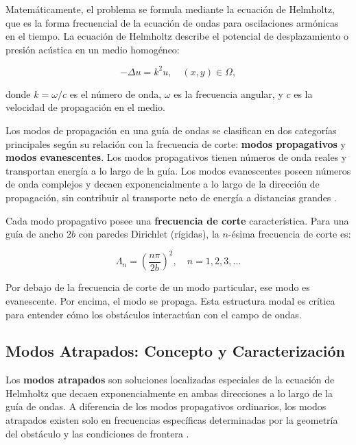 \documentclass[11pt]{article}
\begin{document}
Matemáticamente, el problema se formula mediante la ecuación de Helmholtz, que es la forma frecuencial de la ecuación de ondas para oscilaciones armónicas en el tiempo. La ecuación de Helmholtz describe el potencial de desplazamiento o presión acústica en un medio homogéneo:

\begin{equation}
-\Delta u = k^2 u, \quad (x, y) \in \Omega,
\end{equation}

donde $k = \omega/c$ es el número de onda, $\omega$ es la frecuencia angular, y $c$ es la velocidad de propagación en el medio.

Los modos de propagación en una guía de ondas se clasifican en dos categorías principales según su relación con la frecuencia de corte: \textbf{modos propagativos} y \textbf{modos evanescentes}. Los modos propagativos tienen números de onda reales y transportan energía a lo largo de la guía. Los modos evanescentes poseen números de onda complejos y decaen exponencialmente a lo largo de la dirección de propagación, sin contribuir al transporte neto de energía a distancias grandes \cite{Pagneux2007}.

Cada modo propagativo posee una \textbf{frecuencia de corte} característica. Para una guía de ancho $2b$ con paredes Dirichlet (rígidas), la $n$-ésima frecuencia de corte es:

\begin{equation}
\Lambda_n = \left( \frac{n \pi}{2b} \right)^2, \quad n = 1, 2, 3, \ldots
\end{equation}

Por debajo de la frecuencia de corte de un modo particular, ese modo es evanescente. Por encima, el modo se propaga. Esta estructura modal es crítica para entender cómo los obstáculos interactúan con el campo de ondas.

\subsection{Modos Atrapados: Concepto y Caracterización}\label{subsec:problem}

Los \textbf{modos atrapados} son soluciones localizadas especiales de la ecuación de Helmholtz que decaen exponencialmente en ambas direcciones a lo largo de la guía de ondas. A diferencia de los modos propagativos ordinarios, los modos atrapados existen solo en frecuencias específicas determinadas por la geometría del obstáculo y las condiciones de frontera \cite{Zhevandrov2025, Khallaf2000}.
\end{document}
